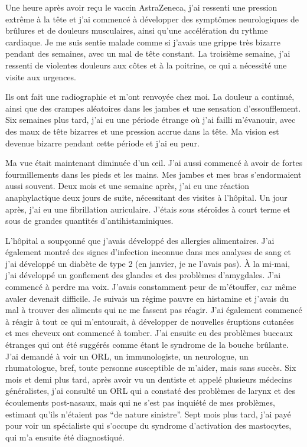 Une heure après avoir reçu le vaccin AstraZeneca, j'ai ressenti une pression
extrême à la tête et j'ai commencé à développer des symptômes neurologiques de
brûlures et de douleurs musculaires, ainsi qu'une accélération du rythme
cardiaque. Je me suis sentie malade comme si j'avais une grippe très bizarre
pendant des semaines, avec un mal de tête constant. La troisième semaine, j'ai
ressenti de violentes douleurs aux côtes et à la poitrine, ce qui a nécessité
une visite aux urgences.

Ils ont fait une radiographie et m'ont renvoyée chez moi. La douleur a continué,
ainsi que des crampes aléatoires dans les jambes et une sensation
d'essoufflement. Six semaines plus tard, j'ai eu une période étrange où j'ai
failli m'évanouir, avec des maux de tête bizarres et une pression accrue dans la
tête. Ma vision est devenue bizarre pendant cette période et j'ai eu peur.

Ma vue était maintenant diminuée d'un œil. J'ai aussi commencé à avoir de fortes
fourmillements dans les pieds et les mains. Mes jambes et mes bras s'endormaient
aussi souvent. Deux mois et une semaine après, j'ai eu une réaction
anaphylactique deux jours de suite, nécessitant des visites à l'hôpital. Un jour
après, j'ai eu une fibrillation auriculaire. J'étais sous stéroïdes à court
terme et sous de grandes quantités d'antihistaminiques.

L'hôpital a soupçonné que j'avais développé des allergies alimentaires. J'ai
également montré des signes d'infection inconnue dans mes analyses de sang et
j'ai développé un diabète de type 2 (en janvier, je ne l'avais pas). À la
mi-mai, j'ai développé un gonflement des glandes et des problèmes
d'amygdales. J'ai commencé à perdre ma voix. J'avais constamment peur de
m'étouffer, car même avaler devenait difficile. Je suivais un régime pauvre en
histamine et j'avais du mal à trouver des aliments qui ne me fassent pas
réagir. J'ai également commencé à réagir à tout ce qui m'entourait, à développer
de nouvelles éruptions cutanées et mes cheveux ont commencé à tomber. J'ai
ensuite eu des problèmes buccaux étranges qui ont été suggérés comme étant le
syndrome de la bouche brûlante. J'ai demandé à voir un ORL, un immunologiste, un
neurologue, un rhumatologue, bref, toute personne susceptible de m'aider, mais
sans succès. Six mois et demi plus tard, après avoir vu un dentiste et appelé
plusieurs médecins généralistes, j'ai consulté un ORL qui a constaté des
problèmes de larynx et des écoulements post-nasaux, mais qui ne s'est pas
inquiété de mes problèmes, estimant qu'ils n'étaient pas “de nature
sinistre”. Sept mois plus tard, j'ai payé pour voir un spécialiste qui s'occupe
du syndrome d'activation des mastocytes, qui m'a ensuite été diagnostiqué.

